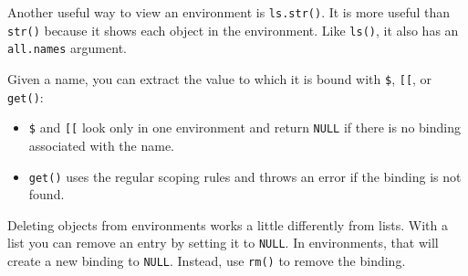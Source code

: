 Another useful way to view an environment is \texttt{ls.str()}. It is
more useful than \texttt{str()} because it shows each object in the
environment. Like \texttt{ls()}, it also has an \texttt{all.names}
argument.

\begin{Shaded}
\begin{Highlighting}[]
\end{Highlighting}
\end{Shaded}

Given a name, you can extract the value to which it is bound with
\texttt{\$}, \texttt{{[}{[}}, or \texttt{get()}:

\begin{itemize}
\item
  \texttt{\$} and \texttt{{[}{[}} look only in one environment and
  return \texttt{NULL} if there is no binding associated with the name.
  \indexc{\$} \indexc{[[}
\item
  \texttt{get()} uses the regular scoping rules and throws an error if
  the binding is not found. 
\end{itemize}

\begin{Shaded}
\begin{Highlighting}[]
\StringTok{ }
\NormalTok{e[[}\NormalTok{]]}
\NormalTok{(}\NormalTok{, } 
\end{Highlighting}
\end{Shaded}

Deleting objects from environments works a little differently from
lists. With a list you can remove an entry by setting it to
\texttt{NULL}. In environments, that will create a new binding to
\texttt{NULL}. Instead, use \texttt{rm()} to remove the binding.
 

\begin{Shaded}
\begin{Highlighting}[]
\StringTok{ }\NormalTok{()}

\StringTok{ }
\StringTok{ }

\NormalTok{(}\NormalTok{, } 
\end{Highlighting}
\end{Shaded}

